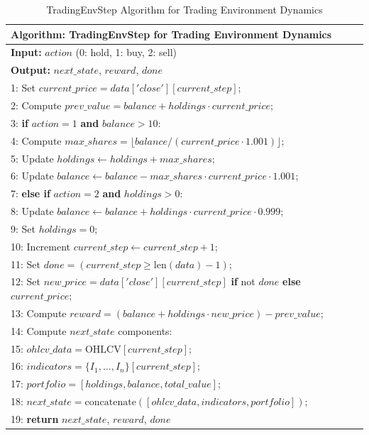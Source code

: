 \begin{table}[h]
\small
\centering
\begin{tabular}{|p{14cm}|}
\hline
\textbf{Algorithm: TradingEnvStep for Trading Environment Dynamics} \\
\hline
\textbf{Input:} $action$ (0: hold, 1: buy, 2: sell) \\
\textbf{Output:} $next\_state$, $reward$, $done$ \\
\hline
1: Set $current\_price = data['close'][current\_step]$; \\
2: Compute $prev\_value = balance + holdings \cdot current\_price$; \\
3: \textbf{if} $action = 1$ \textbf{and} $balance > 10$: \\
4: \quad Compute $max\_shares = \lfloor balance / (current\_price \cdot 1.001) \rfloor$; \\
5: \quad Update $holdings \leftarrow holdings + max\_shares$; \\
6: \quad Update $balance \leftarrow balance - max\_shares \cdot current\_price \cdot 1.001$; \\
7: \textbf{else if} $action = 2$ \textbf{and} $holdings > 0$: \\
8: \quad Update $balance \leftarrow balance + holdings \cdot current\_price \cdot 0.999$; \\
9: \quad Set $holdings = 0$; \\
10: Increment $current\_step \leftarrow current\_step + 1$; \\
11: Set $done = (current\_step \geq \text{len}(data) - 1)$; \\
12: Set $new\_price = data['close'][current\_step]$ \textbf{if} not $done$ \textbf{else} $current\_price$; \\
13: Compute $reward = (balance + holdings \cdot new\_price) - prev\_value$; \\
14: Compute $next\_state$ components: \\
15: \quad $ohlcv\_data = \text{OHLCV}[current\_step]$; \\
16: \quad $indicators = \{I_1, \ldots, I_n\}[current\_step]$; \\
17: \quad $portfolio = [holdings, balance, total\_value]$; \\
18: \quad $next\_state = \text{concatenate}([ohlcv\_data, indicators, portfolio])$; \\
19: \textbf{return} $next\_state$, $reward$, $done$ \\
\hline
\end{tabular}
\caption{TradingEnvStep Algorithm for Trading Environment Dynamics}
\label{tab:tradingenvstep_algorithm}
\end{table}


